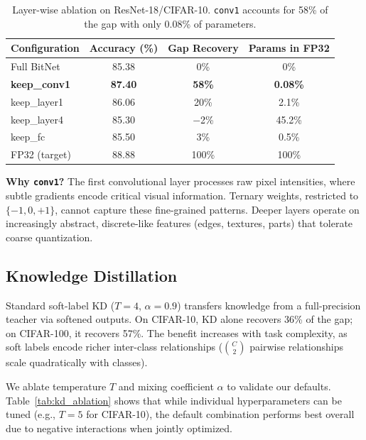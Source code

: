 \documentclass[10pt]{article}
\begin{document}
\begin{table}[ht]
\centering
\caption{Layer-wise ablation on ResNet-18/CIFAR-10. \texttt{conv1} accounts for 58\% of the gap with only 0.08\% of parameters.}
\label{tab:ablation_short}
\small
\begin{tabular}{lccc}
\toprule
Configuration & Accuracy (\%) & Gap Recovery & Params in FP32 \\
\midrule
Full BitNet & 85.38 & 0\% & 0\% \\
\textbf{keep\_conv1} & \textbf{87.40} & \textbf{58\%} & \textbf{0.08\%} \\
keep\_layer1 & 86.06 & 20\% & 2.1\% \\
keep\_layer4 & 85.30 & $-$2\% & 45.2\% \\
keep\_fc & 85.50 & 3\% & 0.5\% \\
\midrule
FP32 (target) & 88.88 & 100\% & 100\% \\
\bottomrule
\end{tabular}
\end{table}

\textbf{Why \texttt{conv1}?} The first convolutional layer processes raw pixel intensities, where subtle gradients encode critical visual information. Ternary weights, restricted to $\{-1,0,+1\}$, cannot capture these fine-grained patterns. Deeper layers operate on increasingly abstract, discrete-like features (edges, textures, parts) that tolerate coarse quantization.

\subsection{Knowledge Distillation}

Standard soft-label KD ($T=4$, $\alpha=0.9$) transfers knowledge from a full-precision teacher via softened outputs. On CIFAR-10, KD alone recovers 36\% of the gap; on CIFAR-100, it recovers 57\%. The benefit increases with task complexity, as soft labels encode richer inter-class relationships ($\binom{C}{2}$ pairwise relationships scale quadratically with classes).

We ablate temperature $T$ and mixing coefficient $\alpha$ to validate our defaults. Table~\ref{tab:kd_ablation} shows that while individual hyperparameters can be tuned (e.g., $T=5$ for CIFAR-10), the default combination performs best overall due to negative interactions when jointly optimized.
\end{document}
